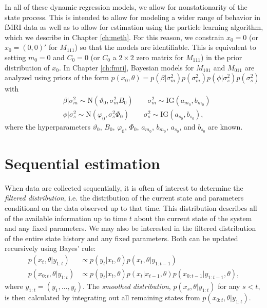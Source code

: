 In all of these dynamic regression models, we allow for nonstationarity of the state process. This is intended to allow for modeling a wider range of behavior in fMRI data as well as to allow for estimation using the particle learning algorithm, which we describe in Chapter \ref{ch:meth}. For this reason, we constrain $x_0 = 0$ (or $x_0 = (0,0)'$ for $M_{111}$) so that the models are identifiable. This is equivalent to setting $m_0 = 0$ and $C_0 = 0$ (or $C_0$ a $2 \times 2$ zero matrix for $M_{111}$) in the prior distribution of $x_0$. In Chapter \ref{ch:fmri}, Bayesian models for $M_{101}$ and $M_{011}$ are analyzed using priors of the form $p(x_0, \theta) = p(\beta|\sigma^2_m)p(\sigma^2_m)p(\phi|\sigma^2_s)p(\sigma^2_s)$ with
\begin{align}
&\beta|\sigma^2_m \sim \mbox{N}(\vartheta_0, \sigma^2_mB_0) \qquad \sigma^2_m \sim \mbox{IG}(a_{m_0}, b_{m_0}) \label{eqn:dynreg:prior1} \\
&\phi|\sigma^2_s \sim \mbox{N}(\varphi_0, \sigma^2_s\Phi_0) \qquad \sigma^2_s \sim \mbox{IG}(a_{s_0}, b_{s_0}), \label{eqn:dynreg:prior2}
\end{align}
where the hyperparameters $\vartheta_0$, $B_0$, $\varphi_0$, $\Phi_0$, $a_{m_0}$, $b_{m_0}$, $a_{s_0}$, and $b_{s_0}$ are known.

\section{Sequential estimation \label{sec:sequential}}

When data are collected sequentially, it is often of interest to determine the \emph{filtered distribution}, i.e. the distribution of the current state and parameters conditional on the data observed up to that time. This distribution describes all of the available information up to time $t$ about the current state of the system and any fixed parameters. We may also be interested in the filtered distribution of the entire state history and any fixed parameters. Both can be updated recursively using Bayes' rule:
\begin{align}
p(x_t,\theta| y_{1:t}) &\propto p(y_t|x_t,\theta)p(x_t,\theta|y_{1:t-1}) \label{eqn:filtered} \\
p(x_{0:t},\theta|y_{1:t}) &\propto p(y_t|x_t,\theta)p(x_t|x_{t-1},\theta)p(x_{0:t-1}|y_{1:t-1},\theta), \label{eqn:filtered:hist}
\end{align}
where $y_{1:t} = (y_1,\ldots,y_t)$. The \emph{smoothed distribution}, $p(x_s,\theta|y_{1:t})$ for any $s < t$, is then calculated by integrating out all remaining states from $p(x_{0:t},\theta|y_{1:t})$.

